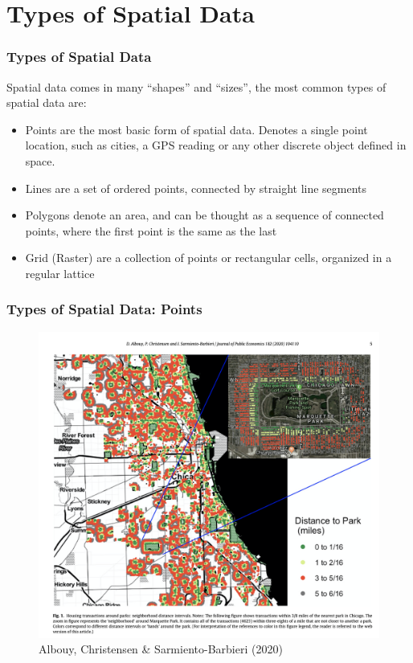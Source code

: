 \documentclass[
  shownotes,
  xcolor={svgnames},
  hyperref={colorlinks,citecolor=DarkBlue,linkcolor=andesred,urlcolor=DarkBlue}
  , aspectratio=169]{beamer}
\begin{document}
\section{Types of Spatial Data}
\begin{frame}[fragile]
\frametitle{Types of Spatial Data}
Spatial data comes in many ``shapes'' and ``sizes'', the most common types of spatial data are:
\medskip
\begin{itemize}
  \item Points are the most basic form of spatial data. Denotes a single point location, such as cities, a GPS reading or any other discrete object defined in space.
  \medskip
  \item Lines are a set of ordered points, connected by straight line segments
  \medskip
  \item Polygons denote an area, and can be thought as a sequence of connected points, where the first point is the same as the last
  \medskip
  \item Grid (Raster) are a collection of points or rectangular cells, organized in a regular lattice
\end{itemize}

\end{frame}
\begin{frame}[fragile]
\frametitle{Types of Spatial Data: Points}

\begin{figure}[H] \centering
  
\includegraphics[scale=0.35]{figures/albouy_et_al_fig1.png}
  \\
  \tiny Albouy, Christensen \& Sarmiento-Barbieri (2020)
\end{figure}


\end{frame}
\end{document}
